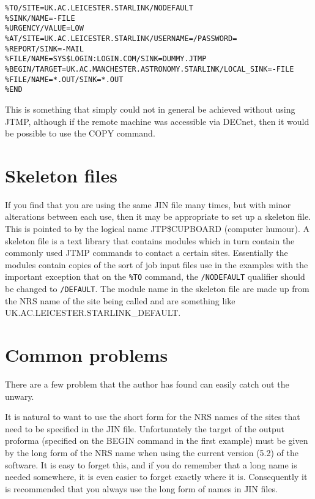 \begin{verbatim}
%TO/SITE=UK.AC.LEICESTER.STARLINK/NODEFAULT
%SINK/NAME=-FILE
%URGENCY/VALUE=LOW
%AT/SITE=UK.AC.LEICESTER.STARLINK/USERNAME=/PASSWORD=
%REPORT/SINK=-MAIL
%FILE/NAME=SYS$LOGIN:LOGIN.COM/SINK=DUMMY.JTMP
%BEGIN/TARGET=UK.AC.MANCHESTER.ASTRONOMY.STARLINK/LOCAL_SINK=-FILE
%FILE/NAME=*.OUT/SINK=*.OUT
%END
\end{verbatim}

This is something that simply could not in general be achieved without using
JTMP, although if the remote machine was accessible via DECnet, then it would
be possible to use the COPY command.

\section{Skeleton files}
\label{skeletons}

If you find that you are using the same JIN file many times, but with minor
alterations between each use, then it may be appropriate to set up a skeleton
file. This is pointed to by the logical name JTP\$CUPBOARD (computer humour). A
skeleton file is a text library that contains modules which in turn contain the
commonly used JTMP commands to contact a certain sites. Essentially the modules
contain copies of the sort of job input files use in the examples with the
important exception that on the {\tt \%TO} command, the {\tt /NODEFAULT}
qualifier should be changed to {\tt /DEFAULT}. The module name in the skeleton
file are made up from the NRS name of the site being called and are something
like UK.AC.\-LEICESTER.\-STARLINK\_DEFAULT.

\section{Common problems}

There are a few problem that the author has found can easily catch out the
unwary.

It is natural to want to use the short form for the NRS names of the sites that
need to be specified in the JIN file. Unfortunately the target of the output
proforma (specified on the BEGIN command in the first example) must be given by
the long form of the NRS name when using the current version (5.2) of the
software. It is easy to forget this, and if you do remember that a long name is
needed somewhere, it is even easier to forget exactly where it is. Consequently
it is recommended that you always use the long form of names in JIN files.

